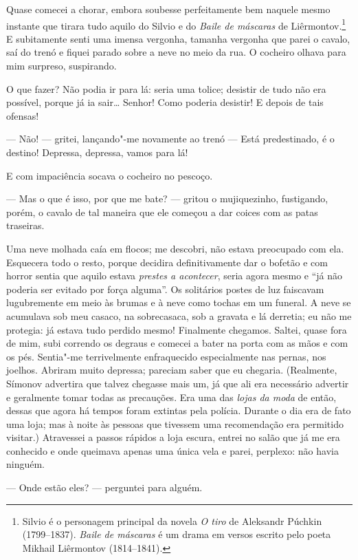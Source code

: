 Quase comecei a chorar, embora soubesse perfeitamente bem naquele mesmo
instante que tirara tudo aquilo do Silvio e do \textit{Baile de máscaras} de
Liêrmontov.\footnote{ Silvio é o personagem principal da novela \textit{O tiro} de
Aleksandr Púchkin (1799--1837). \textit{Baile de máscaras} é um drama em versos
escrito pelo poeta Mikhail Liêrmontov (1814--1841).} E subitamente senti uma
imensa vergonha, tamanha vergonha que parei o cavalo, saí do trenó e fiquei
parado sobre a neve no meio da rua. O cocheiro olhava para mim surpreso,
suspirando.

O que fazer? Não podia ir para lá: seria uma tolice; desistir de tudo não era
possível, porque já ia sair\ldots{} Senhor! Como poderia desistir! E depois de
tais ofensas!

--- Não! --- gritei, lançando"-me novamente ao trenó --- Está predestinado, é o
destino! Depressa, depressa, vamos para lá!

E com impaciência socava o cocheiro no pescoço.

--- Mas o que é isso, por que me bate? --- gritou o mujiquezinho, fustigando,
porém, o cavalo de tal maneira que ele começou a dar coices com as patas
traseiras.

Uma neve molhada caía em flocos; me descobri, não estava preocupado com ela.
Esquecera todo o resto, porque decidira definitivamente dar o bofetão e com
horror sentia que aquilo estava \textit{prestes a acontecer}, seria agora mesmo
e ``já não poderia ser evitado por força alguma''. Os solitários postes de
luz faiscavam lugubremente em meio às brumas e à neve como tochas em um
funeral. A neve se acumulava sob meu casaco, na sobrecasaca, sob a gravata e lá
derretia; eu não me protegia: já estava tudo perdido mesmo! Finalmente
chegamos. Saltei, quase fora de mim, subi correndo os degraus e comecei a bater
na porta com as mãos e com os pés. Sentia"-me terrivelmente enfraquecido
especialmente nas pernas, nos joelhos.  Abriram muito depressa; pareciam saber
que eu chegaria. (Realmente, Símonov advertira que talvez chegasse mais um, já
que ali era necessário advertir e geralmente tomar todas as precauções. Era uma
das \textit{lojas da moda} de então, dessas que agora há tempos foram extintas pela
polícia. Durante o dia era de fato uma loja; mas à noite às pessoas que
tivessem uma recomendação era permitido visitar.) Atravessei a passos rápidos a
loja escura, entrei no salão que já me era conhecido e onde queimava apenas uma
única vela e parei, perplexo: não havia ninguém.

--- Onde estão eles? --- perguntei para alguém.

